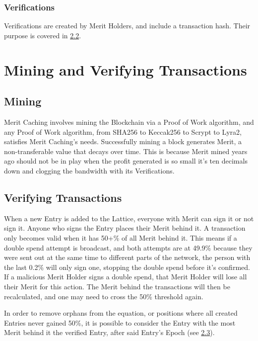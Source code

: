 \documentclass[14pt]{article}
\begin{document}
\label{sec:1.2.2}
\subsubsection{Verifications}
Verifications are created by Merit Holders, and include a transaction hash. Their purpose is covered in \hyperref[sec:2.2]{2.2}.

\newpage

\label{sec:2}
\section{Mining and Verifying Transactions}

\label{sec:2.1}
\subsection{Mining}
Merit Caching involves mining the Blockchain via a Proof of Work algorithm, and any Proof of Work algorithm, from SHA256 to Keccak256 to Scrypt to Lyra2, satisfies Merit Caching's needs. Successfully mining a block generates Merit, a non-transferable value that decays over time. This is because Merit mined years ago should not be in play when the profit generated is so small it's ten decimals down and clogging the bandwidth with its Verifications.

\label{sec:2.2}
\subsection{Verifying Transactions}
When a new Entry is added to the Lattice, everyone with Merit can sign it or not sign it. Anyone who signs the Entry places their Merit behind it. A transaction only becomes valid when it has 50+\% of all Merit behind it. This means if a double spend attempt is broadcast, and both attempts are at 49.9\% because they were sent out at the same time to different parts of the network, the person with the last 0.2\% will only sign one, stopping the double spend before it's confirmed. If a malicious Merit Holder signs a double spend, that Merit Holder will lose all their Merit for this action. The Merit behind the transactions will then be recalculated, and one may need to cross the 50\% threshold again.

In order to remove orphans from the equation, or positions where all created Entries never gained 50\%, it is possible to consider the Entry with the most Merit behind it the verified Entry, after said Entry's Epoch (see \hyperref[sec:2.3]{2.3}).
\end{document}

